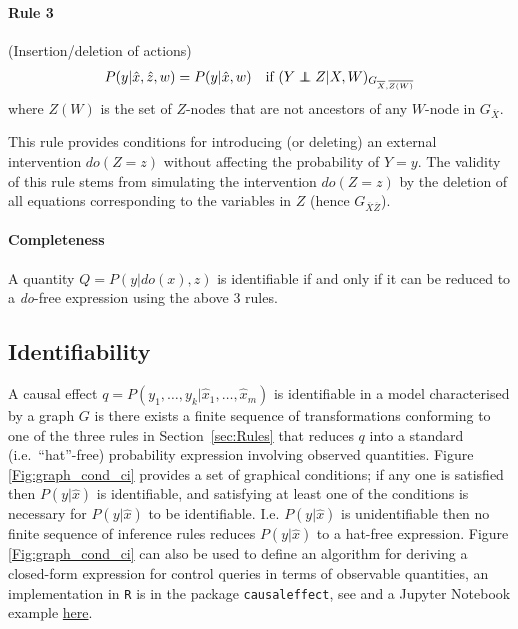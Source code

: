 \documentclass[11pt]{article}
\numberwithin{equation}{section}
\newcommand\indep{\protect\mathpalette{\protect\independenT}{\perp}}
\def\independenT#1#2{\mathrel{\rlap{$#1#2$}\mkern2mu{#1#2}}}
\begin{document}
\paragraph{Rule 3} (Insertion/deletion of actions)
\begin{equation}
P(y|\hat{x},\hat{z},w) = P(y|\hat{x},w) \quad \text{if}\ (Y \indep Z|X,W)_{G_{{\overline{X},\overline{Z(W)}}}}
\end{equation}
where $Z(W)$ is the set of $Z$-nodes that are not ancestors of any $W$-node in $G_{\overline{X}}$.

This rule provides conditions for introducing (or deleting) an external intervention $do(Z=z)$ without affecting the probability of $Y=y$. The validity of this rule stems from simulating the intervention $do(Z=z)$ by the deletion of all equations corresponding to the variables in $Z$ (hence $G_{\overline{X} \overline{Z}}$).

\paragraph{Completeness} A quantity $Q=P(y|do(x),z)$ is identifiable if and only if it can be reduced to a \textit{do}-free expression using the above 3 rules.

\subsection{Identifiability}
A causal effect $q = P(y_1, \dots, y_k| \hat{x}_1, \dots, \hat{x}_m)$ is identifiable in a model characterised by a graph $G$ is there exists a finite sequence of transformations conforming to one of the three rules in Section~\ref{sec:Rules} that reduces $q$ into a standard (i.e.\ ``hat''-free) probability expression involving observed quantities. Figure \ref{Fig:graph_cond_ci} provides a set of graphical conditions; if any one is satisfied then $P(y|\hat{x})$ is identifiable, and satisfying at least one of the conditions is necessary for $P(y|\hat{x})$ to be identifiable. I.e. $P(y|\hat{x})$ is unidentifiable then no finite sequence of inference rules reduces $P(y|\hat{x})$ to a hat-free expression. Figure \ref{Fig:graph_cond_ci} can also be used to define an algorithm for deriving a closed-form expression for control queries in terms of observable quantities, an implementation in \texttt{R} is in the package \texttt{causaleffect}, see \cite{tikka17} and a Jupyter Notebook example \href{https://github.com/jaryaman/ML_demos/blob/master/Notebooks/do-calculus.ipynb}{here}.
\end{document}
